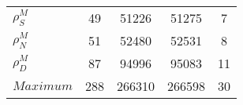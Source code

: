 \begin{center}
\begin{longtable}{lcccc}
$ {\rho^{M}_{S}}       $	 & 	                   49	 & 	                51226	 & 	                51275	 & 	                    7 \\ 
$ {\rho^{M}_{N}}       $	 & 	                   51	 & 	                52480	 & 	                52531	 & 	                    8 \\ 
$ {\rho^{M}_{D}}       $	 & 	                   87	 & 	                94996	 & 	                95083	 & 	                   11 \\ 
$Maximum               $	 & 	                  288	 & 	               266310	 & 	               266598	 & 	                   30 \\ 
\end{longtable}
 \end{center}
